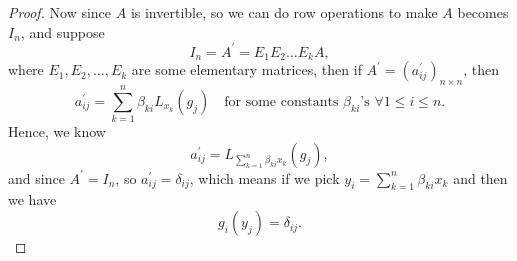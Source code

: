 \begin{proof}
    Now since \(A\) is invertible, so we can do row operations to make \(A\) becomes \(I_n\), and suppose 
    \[
        I_n = A^{\prime} = E_1 E_2 \dots E_k A, 
    \] where \(E_1, E_2, \dots , E_k\) are some elementary matrices, then if \(A^{\prime} = \left( a_{ij}^{\prime}  \right)_{n \times n} \), then 
    \[
        a _{ij}^{\prime} = \sum_{k=1}^n \beta _{ki} L_{x_k} (g_j) \quad \text{for some constants } \beta _{ki}\text{'s } \forall 1 \le i \le n.
    \] Hence, we know 
    \[
        a_{ij}^{\prime} = L_{\sum_{k=1}^n \beta _{ki} x_k } (g_j),
    \] and since \(A^{\prime} = I_n\), so \(a_{ij}^{\prime} = \delta _{ij}\), which means if we pick \(y_i = \sum_{k=1}^n \beta _{ki}x_k \) and then we have
    \[
        g_i(y_j) = \delta _{ij}. 
    \]
\end{proof}